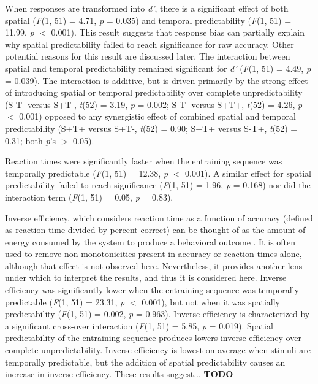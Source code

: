 \documentclass[dwyatte_dissertation.tex]{subfiles}
\begin{document}
When responses are transformed into \textit{d'}, there is a significant effect of both spatial (\textit{F}(1, 51) = 4.71, \textit{p} = 0.035) and temporal predictability (\textit{F}(1, 51) = 11.99, \textit{p} $<$ 0.001). This result suggests that response bias can partially explain why spatial predictability failed to reach significance for raw accuracy. Other potential reasons for this result are discussed later. The interaction between spatial and temporal predictability remained significant for \textit{d'} (\textit{F}(1, 51) = 4.49, \textit{p} = 0.039). The interaction is additive, but is driven primarily by the strong effect of introducing spatial or temporal predictability over complete unpredictability (S-T- versus S+T-, \textit{t}(52) = 3.19, \textit{p} = 0.002; S-T- versus S+T+, \textit{t}(52) = 4.26, \textit{p} $<$ 0.001) opposed to any synergistic effect of combined spatial and temporal predictability (S+T+ versus S+T-, \textit{t}(52) = 0.90; S+T+ versus S-T+, \textit{t}(52) = 0.31; both \textit{p}'s $>$ 0.05).

Reaction times were significantly faster when the entraining sequence was temporally predictable (\textit{F}(1, 51) = 12.38, \textit{p} $<$ 0.001). A similar effect for spatial predictability failed to reach significance (\textit{F}(1, 51) = 1.96, \textit{p} = 0.168) nor did the interaction term (\textit{F}(1, 51) = 0.05, \textit{p} = 0.83).

Inverse efficiency, which considers reaction time as a function of accuracy (defined as reaction time divided by percent correct) can be thought of as the amount of energy consumed by the system to produce a behavioral outcome \cite{TownshendAshby83}. It is often used to remove non-monotonicities present in accuracy or reaction times alone, although that effect is not observed here. Nevertheless, it provides another lens under which to interpret the results, and thus it is considered here. Inverse efficiency was significantly lower when the entraining sequence was temporally predictable (\textit{F}(1, 51) = 23.31, \textit{p} $<$ 0.001), but not when it was spatially predictability (\textit{F}(1, 51) = 0.002, \textit{p} = 0.963). Inverse efficiency is characterized by a significant cross-over interaction (\textit{F}(1, 51) = 5.85, \textit{p} = 0.019). Spatial predictability of the entraining sequence produces lowers inverse efficiency over complete unpredictability. Inverse efficiency is lowest on average when stimuli are temporally predictable, but the addition of spatial predictability causes an increase in inverse efficiency. These results suggest... \textbf{TODO} 
\end{document}
